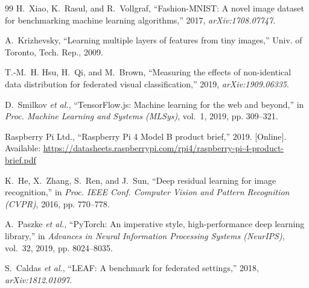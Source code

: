 \documentclass[conference]{IEEEtran}
\begin{document}
\begin{thebibliography}{99}
H.~Xiao, K.~Rasul, and R.~Vollgraf, ``Fashion-MNIST: A novel image dataset for benchmarking machine learning algorithms,'' 2017, \textit{arXiv:1708.07747}.

A.~Krizhevsky, ``Learning multiple layers of features from tiny images,'' Univ. of Toronto, Tech. Rep., 2009.

T.-M.~H. Hsu, H.~Qi, and M.~Brown, ``Measuring the effects of non-identical data distribution for federated visual classification,'' 2019, \textit{arXiv:1909.06335}.

D.~Smilkov \textit{et al.}, ``TensorFlow.js: Machine learning for the web and beyond,'' in \textit{Proc. Machine Learning and Systems (MLSys)}, vol.~1, 2019, pp. 309--321.

Raspberry Pi Ltd., ``Raspberry Pi 4 Model B product brief,'' 2019. [Online]. Available: \url{https://datasheets.raspberrypi.com/rpi4/raspberry-pi-4-product-brief.pdf}

K.~He, X.~Zhang, S.~Ren, and J.~Sun, ``Deep residual learning for image recognition,'' in \textit{Proc. IEEE Conf. Computer Vision and Pattern Recognition (CVPR)}, 2016, pp. 770--778.

A.~Paszke \textit{et al.}, ``PyTorch: An imperative style, high-performance deep learning library,'' in \textit{Advances in Neural Information Processing Systems (NeurIPS)}, vol.~32, 2019, pp. 8024--8035.

S.~Caldas \textit{et al.}, ``LEAF: A benchmark for federated settings,'' 2018, \textit{arXiv:1812.01097}.

\end{thebibliography}
\end{document}
